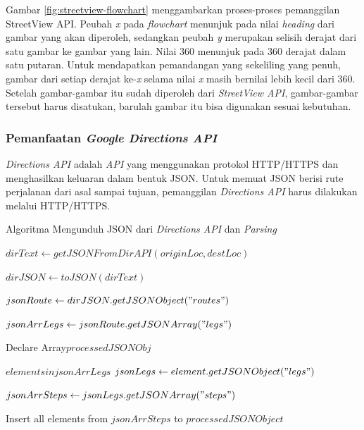 Gambar \ref{fig:streetview-flowchart} menggambarkan proses-proses pemanggilan StreetView API. Peubah \textit{x} pada \textit{flowchart} menunjuk pada nilai \textit{heading} dari gambar yang akan diperoleh, sedangkan peubah \textit{y} merupakan selisih derajat dari satu gambar ke gambar yang lain. Nilai 360 menunjuk pada 360 derajat dalam satu putaran. Untuk mendapatkan pemandangan yang sekeliling yang penuh, gambar dari setiap derajat ke-\textit{x} selama nilai \textit{x} masih bernilai lebih kecil dari 360. Setelah gambar-gambar  itu sudah diperoleh dari \textit{StreetView API}, gambar-gambar tersebut harus disatukan, barulah gambar itu bisa digunakan sesuai kebutuhan.


\subsubsection{Pemanfaatan \textit{Google Directions API}}
\textit{Directions API} adalah \textit{API} yang menggunakan protokol HTTP/HTTPS dan menghasilkan keluaran dalam bentuk JSON. Untuk memuat JSON berisi rute perjalanan dari asal sampai tujuan, pemanggilan \textit{Directions API} harus dilakukan melalui HTTP/HTTPS.

\begin{algorithm}
	\caption{Algoritma Mengunduh JSON dari \textit{Directions API} dan \textit{Parsing}}
	\label{alg:algoritma-directions-parsing}
	\begin{algorithmic}[1]
		\State $dirText \gets getJSONFromDirAPI(originLoc,destLoc)$ 
		
		\State $dirJSON \gets toJSON(dirText)$	
		
		\State $jsonRoute \gets dirJSON.getJSONObject("routes")$
		
		\State $jsonArrLegs \gets jsonRoute.getJSONArray("legs")$

		\State Declare Array$processedJSONObj$		
		
		\For $ elements in jsonArrLegs$
		\State $jsonLegs \gets element.getJSONObject("legs") $

		\State $jsonArrSteps \gets jsonLegs.getJSONArray("steps")$		
		
		\State Insert all elements from $jsonArrSteps$ to $processedJSONObject$ 
			
		
		\EndFor
%		
	\EndFunction  
	\end{algorithmic}
\end{algorithm}

